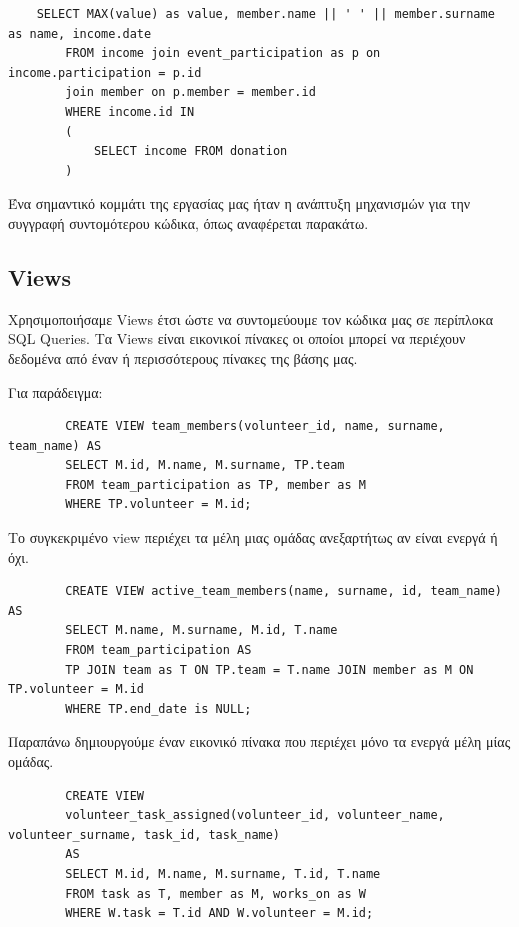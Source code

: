 \documentclass[manuscript,screen,review]{acmart}
\newcommand{\en}[1]{\foreignlanguage{english}{#1}}
\begin{document}
    \begin{lstlisting}
    SELECT MAX(value) as value, member.name || ' ' || member.surname as name, income.date 
        FROM income join event_participation as p on income.participation = p.id
        join member on p.member = member.id
        WHERE income.id IN 
        (
            SELECT income FROM donation
        )
    \end{lstlisting}

Ένα σημαντικό κομμάτι της εργασίας μας ήταν η ανάπτυξη μηχανισμών για την συγγραφή συντομότερου κώδικα, όπως αναφέρεται παρακάτω.

\subsection{\en{Views}}

Χρησιμοποιήσαμε \en{Views} έτσι ώστε να συντομεύουμε τον κώδικα μας σε περίπλοκα \en{SQL Queries}. Tα \en{Views} είναι εικονικοί πίνακες οι οποίοι μπορεί να περιέχουν δεδομένα από έναν ή περισσότερους πίνακες της βάσης μας. 

Για παράδειγμα:

    \begin{lstlisting}
        CREATE VIEW team_members(volunteer_id, name, surname, team_name) AS
        SELECT M.id, M.name, M.surname, TP.team
        FROM team_participation as TP, member as M
        WHERE TP.volunteer = M.id;
    \end{lstlisting}

Το συγκεκριμένο \en{view} περιέχει τα μέλη μιας ομάδας ανεξαρτήτως αν είναι ενεργά ή όχι.

    \begin{lstlisting}
        CREATE VIEW active_team_members(name, surname, id, team_name) AS
        SELECT M.name, M.surname, M.id, T.name 
        FROM team_participation ΑS
        TP JOIN team as T ON TP.team = T.name JOIN member as M ON TP.volunteer = M.id 
        WHERE TP.end_date is NULL;
    \end{lstlisting}

Παραπάνω δημιουργούμε έναν εικονικό πίνακα που περιέχει μόνο τα ενεργά μέλη μίας ομάδας.
    
    \begin{lstlisting}
        CREATE VIEW 
        volunteer_task_assigned(volunteer_id, volunteer_name, volunteer_surname, task_id, task_name) 
        AS
        SELECT M.id, M.name, M.surname, T.id, T.name
        FROM task as T, member as M, works_on as W
        WHERE W.task = T.id AND W.volunteer = M.id;
    \end{lstlisting}
    
\end{document}
